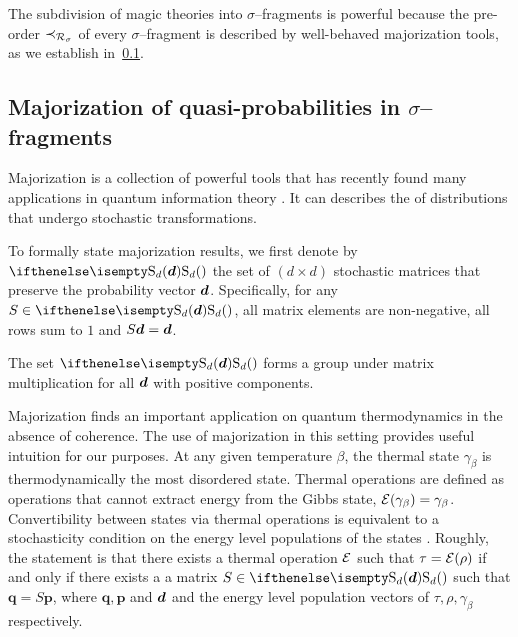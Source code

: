\documentclass[pra,
aps,
twocolumn,
superscriptaddress,
groupedaddress,
nofootinbib,
reprint
]{revtex4-1}
\begin{document}
The subdivision of magic theories into $\sigma$--fragments is powerful because the pre-order $\prec_{\mathcal{R}_\sigma}$ of every $\sigma$--fragment is described by well-behaved majorization tools, as we establish in~\cref{sec:major}.

\subsection{Majorization of quasi-probabilities in $\sigma$--fragments}\label{sec:major}

Majorization is a collection of powerful tools that has recently found many applications in quantum information theory .
It can describes the  of distributions that undergo stochastic transformations.

To formally state majorization results, we first denote by $\stoch$ the set of $(d \times d)$ stochastic matrices that preserve the probability vector $\bm{d}$. 
Specifically, for any $S \in \stoch$, all matrix elements are non-negative, all rows sum to $1$ and $S\bm{d} = \bm{d}$.

The set $\stoch$ forms a group under matrix multiplication for all $\bm{d}$ with positive components.

Majorization finds an important application on quantum thermodynamics in the absence of coherence.
The use of majorization in this setting provides useful intuition for our purposes.
At any given temperature $\beta$, the thermal state $\gamma_\beta$ is thermodynamically the most disordered state. 
Thermal operations are defined as operations that cannot extract energy from the Gibbs state, $\mathcal{E}(\gamma_\beta) = \gamma_\beta$.
Convertibility between states via thermal operations is equivalent to a stochasticity condition on the energy level populations of the states .
Roughly, the statement is that there exists a thermal operation $\mathcal{E}$ such that $\tau = \mathcal{E}(\rho)$ if and only if there exists a a matrix $S \in \stoch$ such that $\bm{q} = S\bm{p}$, where $\bm{q}, \bm{p}$ and $\bm{d}$ and the energy level population vectors of $\tau, \rho, \gamma_\beta$ respectively.
\end{document}
